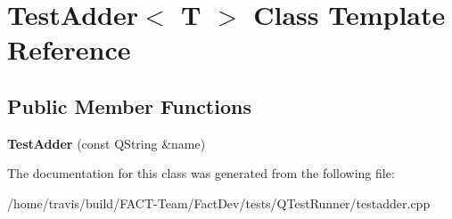 \hypertarget{classTestAdder}{\section{Test\-Adder$<$ T $>$ Class Template Reference}
\label{classTestAdder}
}
\subsection*{Public Member Functions}
\begin{DoxyCompactItemize}
\item 
\hypertarget{classTestAdder_a64f9008ae27868e36acdd5c94eebae3b}{{\bfseries Test\-Adder} (const Q\-String \&name)}\label{classTestAdder_a64f9008ae27868e36acdd5c94eebae3b}

\end{DoxyCompactItemize}


The documentation for this class was generated from the following file\-:\begin{DoxyCompactItemize}
\item 
/home/travis/build/\-F\-A\-C\-T-\/\-Team/\-Fact\-Dev/tests/\-Q\-Test\-Runner/testadder.\-cpp\end{DoxyCompactItemize}
